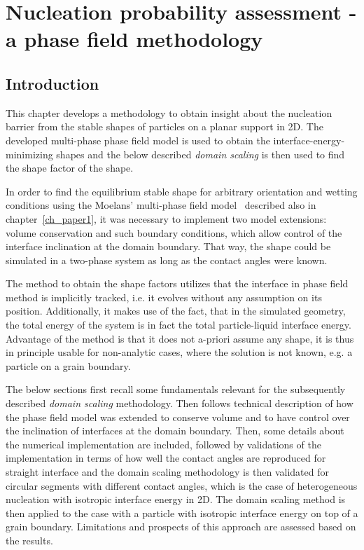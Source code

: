 \chapter{Nucleation probability assessment - a phase field methodology}\label{ch_NPA_PF_methodology}

\section{Introduction}
This chapter develops a methodology to obtain insight about the nucleation barrier from the stable shapes of particles on a planar support in 2D. The developed multi-phase phase field model is used to obtain the interface-energy-minimizing shapes and the below described \textit{domain scaling} is then used to find the shape factor of the shape. 

In order to find the equilibrium stable shape for arbitrary orientation and wetting conditions using the Moelans' multi-phase field model~\cite{Moelans2008} described also in chapter~\ref{ch_paper1}, it was necessary to implement two model extensions: volume conservation and such boundary conditions, which allow control of the interface inclination at the domain boundary. That way, the shape could be simulated in a two-phase system as long as the contact angles were known.


The method to obtain the shape factors utilizes that the interface in phase field method is implicitly tracked, i.e. it evolves without any assumption on its position. Additionally, it makes use of the fact, that in the simulated geometry, the total energy of the system is in fact the total particle-liquid interface energy. Advantage of the method is that it does not a-priori assume any shape, it is thus in principle usable for non-analytic cases, where the solution is not known, e.g. a particle on a grain boundary.

The below sections first recall some fundamentals relevant for the subsequently described \textit{domain scaling} methodology. Then follows technical description of how the phase field model was extended to conserve volume and to have control over the inclination of interfaces at the domain boundary. Then, some details about the numerical implementation are included, followed by validations of the implementation in terms of how well the contact angles are reproduced for straight interface and the domain scaling methodology is then validated for circular segments with different contact angles, which is the case of heterogeneous nucleation with isotropic interface energy in 2D. The domain scaling method is then applied to the case with a particle with isotropic interface energy on top of a  grain boundary. Limitations and prospects of this approach are assessed based on the results.

